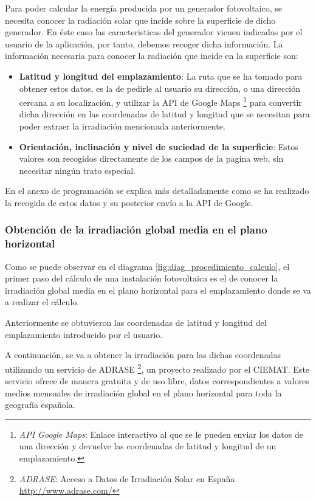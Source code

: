 Para poder calcular la energía producida por un generador fotovoltaico, se necesita conocer la radiación solar que incide sobre la superficie de dicho generador. En éste caso las caracteristicas del generador vienen indicadas por el usuario de la aplicación, por tanto, debemos recoger dicha información. La información necesaria para conocer la radiación que incide en la superficie son:
\begin{itemize}
\item \textbf{Latitud y longitud del emplazamiento}: La ruta que se ha tomado para obtener estos datos, es la de pedirle al usuario su dirección, o una dirección cercana a su localización, y utilizar la API de Google Maps \footnote{\textit{API Google Maps}: Enlace interactivo al que se le pueden enviar los datos de una dirección y devuelve las coordenadas de latitud y longitud de un emplazamiento.  } para convertir dicha dirección en las coordenadas de latitud y longitud que se necesitan para poder extraer la irradiación mencionada anteriormente.\\
\item \textbf{Orientación, inclinación y nivel de suciedad de la superficie}: Estos valores son recogidos directamente de los campos de la pagina web, sin necesitar ningún trato especial.
\end{itemize} 
En el anexo de programación se explica más detalladamente como se ha realizado la recogida de estos datos y su posterior envío a la API de Google.

\subsubsection{Obtención de la irradiación global media en el plano horizontal}
\label{section:get_global_rad}

Como se puede observar en el diagrama \ref{fig:diag_procedimiento_calculo}, el primer paso del cálculo de una instalación fotovoltaica es el de conocer la irradiación global media en el plano horizontal para el emplazamiento donde se va a realizar el cálculo.

 Anteriormente se obtuvieron las coordenadas de latitud y longitud del emplazamiento introducido por el usuario.

A continuación, se va a obtener la irradiación para las dichas coordenadas utilizando un servicio de ADRASE \footnote{\textit{ADRASE}: Acceso a Datos de Irradiación Solar en España \url{http://www.adrase.com/}}, un proyecto realizado por el CIEMAT. Este servicio ofrece de manera gratuita y de uso libre, datos correspondientes a valores medios mensuales de irradiación global en el plano horizontal para toda la geografía española.

